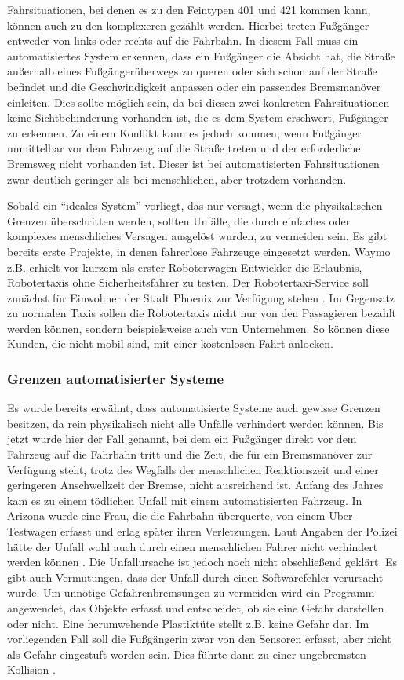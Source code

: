 Fahrsituationen, bei denen es zu den Feintypen 401 und 421 kommen kann, können auch zu den komplexeren gezählt werden. Hierbei treten Fußgänger entweder von links oder rechts auf die Fahrbahn. In diesem Fall muss ein automatisiertes System erkennen, dass ein Fußgänger die Absicht hat, die Straße außerhalb eines Fußgängerüberwegs zu queren oder sich schon auf der Straße befindet und die Geschwindigkeit anpassen oder ein passendes Bremsmanöver einleiten. Dies sollte möglich sein, da bei diesen zwei konkreten Fahrsituationen keine Sichtbehinderung vorhanden ist, die es dem System erschwert, Fußgänger zu erkennen. Zu einem Konflikt kann es jedoch kommen, wenn Fußgänger unmittelbar vor dem Fahrzeug auf die Straße treten und der erforderliche Bremsweg nicht vorhanden ist. Dieser ist bei automatisierten Fahrsituationen zwar deutlich geringer als bei menschlichen, aber trotzdem vorhanden.

Sobald ein \enquote{ideales System} vorliegt, das nur versagt, wenn die physikalischen Grenzen überschritten werden, sollten Unfälle, die durch einfaches oder komplexes menschliches Versagen ausgelöst wurden, zu vermeiden sein. Es gibt bereits erste Projekte, in denen fahrerlose Fahrzeuge eingesetzt werden. Waymo z.B. erhielt vor kurzem als erster Roboterwagen-Entwickler die Erlaubnis, Robotertaxis ohne Sicherheitsfahrer zu testen. Der Robotertaxi-Service soll zunächst für Einwohner der Stadt Phoenix zur Verfügung stehen \parencite{Koch.2018}. Im Gegensatz zu normalen Taxis sollen die Robotertaxis nicht nur von den Passagieren bezahlt werden können, sondern beispielsweise auch von Unternehmen. So können diese Kunden, die nicht mobil sind, mit einer kostenlosen Fahrt anlocken. 

\subsubsection{Grenzen automatisierter Systeme}
Es wurde bereits erwähnt, dass automatisierte Systeme auch gewisse Grenzen besitzen, da rein physikalisch nicht alle Unfälle verhindert werden können. Bis jetzt wurde hier der Fall genannt, bei dem ein Fußgänger direkt vor dem Fahrzeug auf die Fahrbahn tritt und die Zeit, die für ein Bremsmanöver zur Verfügung steht, trotz des Wegfalls der menschlichen Reaktionszeit und einer geringeren Anschwellzeit der Bremse, nicht ausreichend ist. Anfang des Jahres kam es zu einem tödlichen Unfall mit einem automatisierten Fahrzeug. In Arizona wurde eine Frau, die die Fahrbahn überquerte, von einem Uber-Testwagen erfasst und erlag später ihren Verletzungen. Laut Angaben der Polizei hätte der Unfall wohl auch durch einen menschlichen Fahrer nicht verhindert werden können \parencite{SpiegelOnline.2018}. Die Unfallursache ist jedoch noch nicht abschließend geklärt. Es gibt auch Vermutungen, dass der Unfall durch einen Softwarefehler verursacht wurde. Um unnötige Gefahrenbremsungen zu vermeiden wird ein Programm angewendet, das Objekte erfasst und entscheidet, ob sie eine Gefahr darstellen oder nicht. Eine herumwehende Plastiktüte stellt z.B. keine Gefahr dar. Im vorliegenden Fall soll die Fußgängerin zwar von den Sensoren erfasst, aber nicht als Gefahr eingestuft worden sein. Dies führte dann zu einer ungebremsten Kollision \parencite{FrankfurterAllgemeine.2018}.

